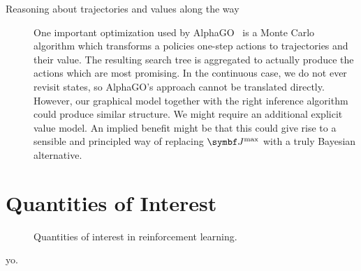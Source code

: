 \begin{description}
    \item[Reasoning about trajectories and values along the way]
        One important optimization used by AlphaGO~\parencite{silver_mastering_2017} is a Monte Carlo algorithm which transforms a policies one-step actions to trajectories and their value.
        The resulting search tree is aggregated to actually produce the actions which are most promising.
        In the continuous case, we do not ever revisit states, so AlphaGO's approach cannot be translated directly.
        However, our graphical model together with the right inference algorithm could produce similar structure.
        We might require an additional explicit value model.
        An implied benefit might be that this could give rise to a sensible and principled way of replacing $\mat{J}^{\text{max}}$ with a truly Bayesian alternative.
\end{description}


\section{Quantities of Interest}
\label{sec:quantities_of_interest}
\begin{figure}[t]
    \centering
    
    \caption[Quantities of interest in reinforcement learning]{
        Quantities of interest in reinforcement learning.
    }
    \label{fig:agent_environment_interaction}
\end{figure}
yo.


\nocite{*}
\printbibliography

